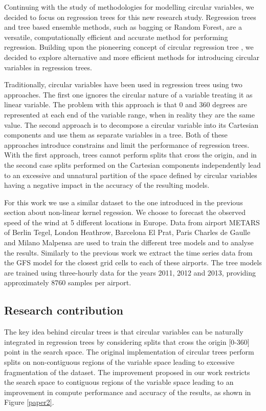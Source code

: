 Continuing with the study of methodologies for modelling circular variables, we decided to focus on regression trees for this new research study. Regression trees and tree based ensemble methods, such as bagging or Random Forest, are a versatile, computationally efficient and accurate method for performing regression. Building upon the pioneering concept of circular regression tree \citep{lund2002tree}, we decided to explore alternative and more efficient methods for introducing circular variables in regression trees.

Traditionally, circular variables have been used in regression trees using two approaches. The first one ignores the circular nature of a variable treating it as linear variable. The problem with this approach is that 0 and 360 degrees are represented at each end of the variable range, when in reality they are the same value. The second approach is to decompose a circular variable into its Cartesian components and use them as separate variables in a tree. Both of these approaches introduce constrains and limit the performance of regression trees. With the first approach, trees cannot perform splits that cross the origin, and in the second case splits performed on the Cartesian components independently lead to an excessive and unnatural partition of the space defined by circular variables having a negative impact in the accuracy of the resulting models. 

For this work we use a similar dataset to the one introduced in the previous section about non-linear kernel regession. We choose to forecast the observed speed of the wind at 5 different locations in Europe. Data from airport METARS of Berlin Tegel, London Heathrow, Barcelona El Prat, Paris Charles de Gaulle and Milano Malpensa are used to train the different tree models and to analyse the results. Similarly to the previous work we extract the time series data from the GFS model for the closest grid cells to each of these airports. The tree models are trained using three-hourly data for the years 2011, 2012 and 2013, providing approximately 8760 samples per airport.


\subsection{Research contribution}
The key idea behind circular trees is that circular variables can be naturally integrated in regression trees by considering splits that cross the origin [0-360] point in the search space. The original implementation of circular trees perform splits on non-contiguous regions of the variable space leading to excessive fragmentation of the dataset. The improvement proposed in our work restricts the search space to contiguous regions of the variable space leading to an improvement in compute performance and accuracy of the results, as shown in Figure \ref{paper2}.

